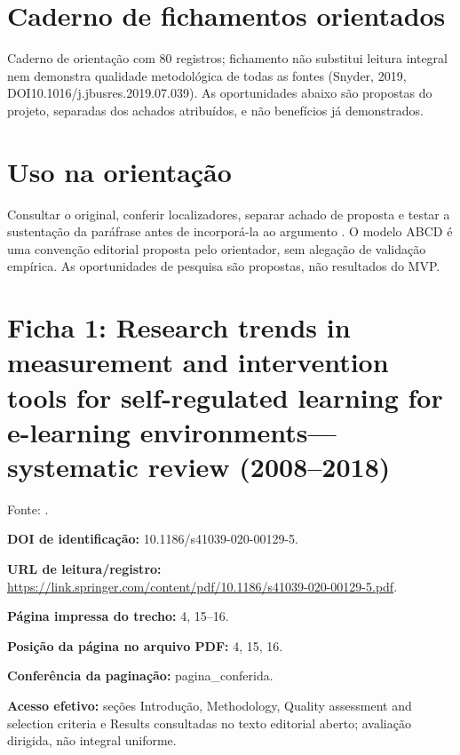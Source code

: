 \section*{Caderno de fichamentos orientados}

Caderno de orientação com 80 registros; fichamento não substitui leitura integral nem demonstra qualidade metodológica de todas as fontes (Snyder, 2019, DOI10.1016/j.jbusres.2019.07.039). As oportunidades abaixo são propostas do projeto, separadas dos achados atribuídos, e não benefícios já demonstrados.

\section*{Uso na orientação}

Consultar o original, conferir localizadores, separar achado de proposta e testar a sustentação da paráfrase antes de incorporá-la ao argumento \citep{SU11}. O modelo ABCD é uma convenção editorial proposta pelo orientador, sem alegação de validação empírica. As oportunidades de pesquisa são propostas, não resultados do MVP.

\clearpage\section*{Ficha 1: Research trends in measurement and intervention tools for self-regulated learning for e-learning environments—systematic review (2008–2018)}

Fonte: \citet[p. 4, 15–16]{education_araka2020}.

\noindent\textbf{DOI de identificação:} 10.1186/s41039-020-00129-5.\par\medskip

\noindent\textbf{URL de leitura/registro:} \url{https://link.springer.com/content/pdf/10.1186/s41039-020-00129-5.pdf}.\par\medskip

\noindent\textbf{Página impressa do trecho:} 4, 15–16.\par\medskip

\noindent\textbf{Posição da página no arquivo PDF:} 4, 15, 16.\par\medskip

\noindent\textbf{Conferência da paginação:} pagina\_conferida.\par\medskip

\noindent\textbf{Acesso efetivo:} seções Introdução, Methodology, Quality assessment and selection criteria e Results consultadas no texto editorial aberto; avaliação dirigida, não integral uniforme.\par\medskip

